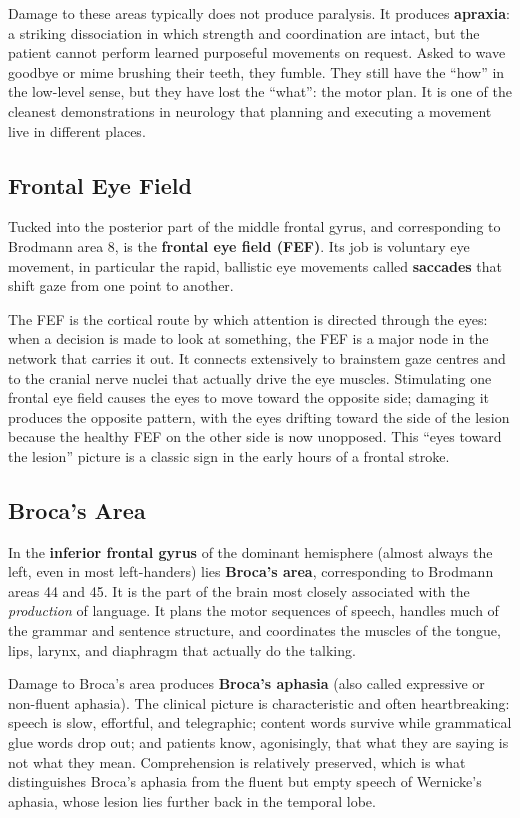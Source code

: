 \documentclass[11pt]{article}
\begin{document}
Damage to these areas typically does not produce paralysis. It produces \textbf{apraxia}: a striking dissociation in which strength and coordination are intact, but the patient cannot perform learned purposeful movements on request. Asked to wave goodbye or mime brushing their teeth, they fumble. They still have the ``how'' in the low-level sense, but they have lost the ``what'': the motor plan. It is one of the cleanest demonstrations in neurology that planning and executing a movement live in different places.

\subsection{Frontal Eye Field}

Tucked into the posterior part of the middle frontal gyrus, and corresponding to Brodmann area 8, is the \textbf{frontal eye field (FEF)}. Its job is voluntary eye movement, in particular the rapid, ballistic eye movements called \textbf{saccades} that shift gaze from one point to another.

The FEF is the cortical route by which attention is directed through the eyes: when a decision is made to look at something, the FEF is a major node in the network that carries it out. It connects extensively to brainstem gaze centres and to the cranial nerve nuclei that actually drive the eye muscles. Stimulating one frontal eye field causes the eyes to move toward the opposite side; damaging it produces the opposite pattern, with the eyes drifting toward the side of the lesion because the healthy FEF on the other side is now unopposed. This ``eyes toward the lesion'' picture is a classic sign in the early hours of a frontal stroke.

\subsection{Broca's Area}

In the \textbf{inferior frontal gyrus} of the dominant hemisphere (almost always the left, even in most left-handers) lies \textbf{Broca's area}, corresponding to Brodmann areas 44 and 45. It is the part of the brain most closely associated with the \textit{production} of language. It plans the motor sequences of speech, handles much of the grammar and sentence structure, and coordinates the muscles of the tongue, lips, larynx, and diaphragm that actually do the talking.

Damage to Broca's area produces \textbf{Broca's aphasia} (also called expressive or non-fluent aphasia). The clinical picture is characteristic and often heartbreaking: speech is slow, effortful, and telegraphic; content words survive while grammatical glue words drop out; and patients know, agonisingly, that what they are saying is not what they mean. Comprehension is relatively preserved, which is what distinguishes Broca's aphasia from the fluent but empty speech of Wernicke's aphasia, whose lesion lies further back in the temporal lobe.
\end{document}
